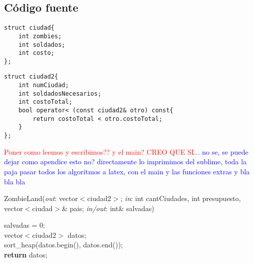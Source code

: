 \newpage

\subsection{C\'odigo fuente}

	\begin{codesnippet}
	\begin{verbatim}
struct ciudad{
    int zombies;
    int soldados;
    int costo;
};
	\end{verbatim}
	\end{codesnippet}

	\begin{codesnippet}
	\begin{verbatim}
struct ciudad2{
    int numCiudad;
    int soldadosNecesarios;
    int costoTotal;
    bool operator< (const ciudad2& otro) const{
        return costoTotal < otro.costoTotal;
    }
};
	\end{verbatim}
	\end{codesnippet}

\textcolor{red}{Poner como leemos y escribimos?? y el main? CREO QUE SI...}
\textcolor{blue}{no se, se puede dejar como apendice esto no? directamente lo imprimimos del sublime, toda la paja pasar todos los algoritmos a latex, con el main y las funciones extras y bla bla bla}


\begin{algorithm}[h!]
\caption{ZombieLand(\textit{out}: vector$<$ciudad2$>$; \textit{in}: int cantCiudades, int presupuesto, vector$<$ciudad$>$\& pais; \textit{in/out}:  int\& salvadas)}
salvadas = 0;\\
vector$<$ciudad2$>$ datos;\\
sort_heap(datos.begin(), datos.end());\\
\textbf{return} datos;
\end{algorithm}

